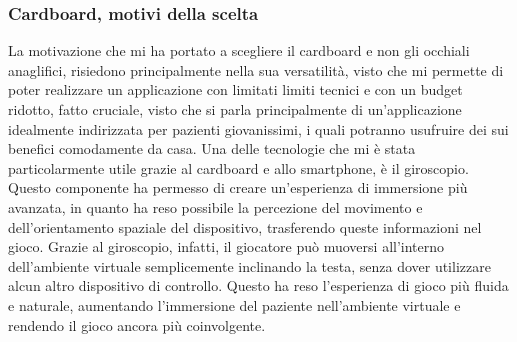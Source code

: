 \documentclass[
a4paper,
cleardoublepage=empty,
headings=twolinechapter,
numbers=autoenddot,
]{scrbook}
\begin{document}
  \subsubsection{Cardboard, motivi della scelta}\label{chap:cardboard_motivi}
    La motivazione che mi ha portato a scegliere il cardboard e non gli occhiali anaglifici, risiedono principalmente nella sua versatilità, visto che mi permette di poter realizzare un applicazione con limitati limiti tecnici e con un budget ridotto, fatto cruciale, visto che si parla principalmente di un'applicazione idealmente indirizzata per pazienti giovanissimi, i quali potranno usufruire dei sui benefici comodamente da casa.
    Una delle tecnologie che mi è stata particolarmente utile grazie al cardboard e allo smartphone, è il giroscopio. Questo componente ha permesso di creare un'esperienza di immersione più avanzata, in quanto ha reso possibile la percezione del movimento e dell'orientamento spaziale del dispositivo, trasferendo queste informazioni nel gioco. Grazie al giroscopio, infatti, il giocatore può muoversi all'interno dell'ambiente virtuale semplicemente inclinando la testa, senza dover utilizzare alcun altro dispositivo di controllo. Questo ha reso l'esperienza di gioco più fluida e naturale, aumentando l'immersione del paziente nell'ambiente virtuale e rendendo il gioco ancora più coinvolgente.
\end{document}
